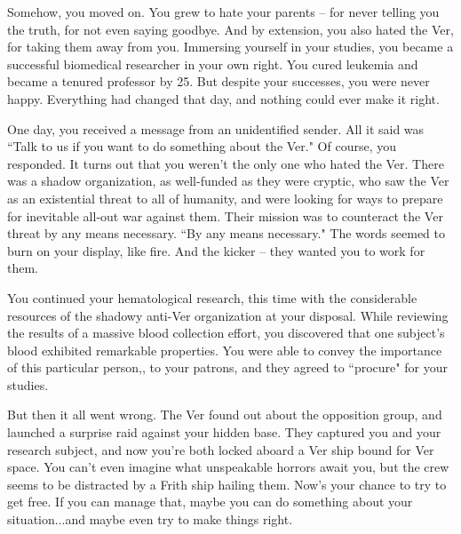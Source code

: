 \documentclass[char]{guildcamp4}
\begin{document}
Somehow, you moved on. You grew to hate your parents -- for never telling you the truth, for not even saying goodbye. And by extension, you also hated the Ver, for taking them away from you. Immersing yourself in your studies, you became a successful biomedical researcher in your own right. You cured leukemia and became a tenured professor by 25. But despite your successes, you were never happy. Everything had changed that day, and nothing could ever make it right.

One day, you received a message from an unidentified sender. All it said was ``Talk to us if you want to do something about the Ver." Of course, you responded. It turns out that you weren't the only one who hated the Ver. There was a shadow organization, as well-funded as they were cryptic, who saw the Ver as an existential threat to all of humanity, and were looking for ways to prepare for inevitable all-out war against them. Their mission was to counteract the Ver threat by any means necessary. ``By any means necessary." The words seemed to burn on your display, like fire. And the kicker -- they wanted you to work for them.

You continued your hematological research, this time with the considerable resources of the shadowy anti-Ver organization at your disposal. While reviewing the results of a massive blood collection effort, you discovered that one subject's blood exhibited remarkable properties. You were able to convey the importance of this particular person,\cPlead{\MYname}, to your patrons, and they agreed to ``procure"  for your studies. 

But then it all went wrong. The Ver found out about the opposition group, and launched a surprise raid against your hidden base. They captured you and your research subject, and now you're both locked aboard a Ver ship bound for Ver space. You can't even imagine what unspeakable horrors await you, but the crew seems to be distracted by a Frith ship hailing them. Now's your chance to try to get free. If you can manage that, maybe you can do something about your situation...and maybe even try to make things right.
\end{document}
